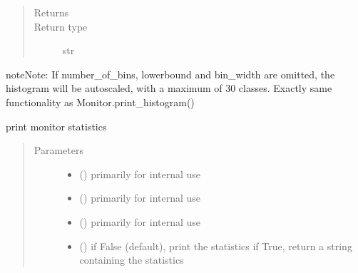 \documentclass[letterpaper,10pt,english]{sphinxmanual}
\begin{document}
\begin{fulllineitems}
\begin{fulllineitems}
\begin{quote}
\begin{description}
\begin{itemize}
\end{itemize}

\item[{Returns}] \leavevmode
{}

\item[{Return type}] \leavevmode
str

\end{description}\end{quote}

\begin{sphinxadmonition}{note}{Note:}
If number\_of\_bins, lowerbound and bin\_width are omitted, the histogram will be autoscaled,
with a maximum of 30 classes. 
Exactly same functionality as Monitor.print\_histogram()
\end{sphinxadmonition}

\end{fulllineitems}


\begin{fulllineitems}
\label{\detokenize{Reference:salabim.Monitor.print_statistics}}
print monitor statistics
\begin{quote}\begin{description}
\item[{Parameters}] \leavevmode\begin{itemize}
\item {} 
 () \textendash{} primarily for internal use

\item {} 
 () \textendash{} primarily for internal use

\item {} 
 () \textendash{} primarily for internal use

\item {} 
 () \textendash{} if False (default), print the statistics
if True, return a string containing the statistics


\end{itemize}
\end{description}
\end{quote}
\end{fulllineitems}
\end{fulllineitems}
\end{document}
